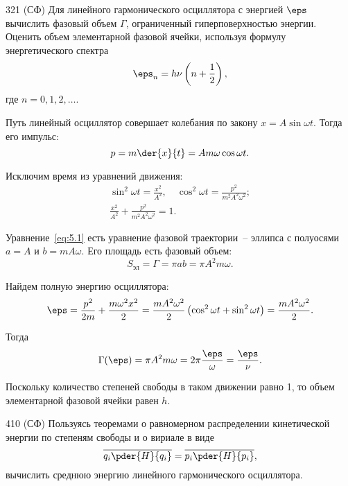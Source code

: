 \documentclass[pscyr]{hedwork}
\begin{document}
  \begin{task}{321 (СФ)}{
    Для линейного гармонического осциллятора с энергией \( \eps \) вычислить
    фазовый объем \( \Gamma \), ограниченный гиперповерхностью энергии. Оценить
    объем элементарной фазовой ячейки, используя формулу энергетического спектра
    \[
      \eps_n = h\nu \left(n + \frac{1}{2}\right),
    \]
    где \( n = 0, 1, 2, \ldots \).
  }
  
    Путь линейный осциллятор совершает колебания по закону
    \( x = A\sin\omega t \). Тогда его импульс:
    \[
      p = m\der{x}{t} = Am\omega\cos\omega t.
    \]
    
    Исключим время из уравнений движения:
    \begin{gather}
      \sin^2\omega t = \frac{x^2}{A^2}, \quad \cos^2\omega t =
        \frac{p^2}{m^2A^2\omega^2}; \nonumber \\
      \frac{x^2}{A^2} + \frac{p^2}{m^2A^2\omega^2} = 1. \label{eq:5.1}
    \end{gather}
    
    Уравнение~\eqref{eq:5.1} есть уравнение фазовой траектории~-- эллипса с
    полуосями \( a = A \) и \( b = mA\omega \). Его площадь есть фазовый объем:
    \[
      S_\text{эл} = \Gamma = \pi ab = \pi A^2m\omega.
    \]
    
    Найдем полную энергию осциллятора:
    \[
      \eps = \frac{p^2}{2m} + \frac{m\omega^2x^2}{2} =
        \frac{mA^2\omega^2}{2}\left(\cos^2\omega t + \sin^2\omega t\right) =
        \frac{mA^2\omega^2}{2}.
    \]
    
    Тогда
    \[
      \Gamma(\eps) = \pi A^2m\omega = 2\pi\frac{\eps}{\omega} =
        \frac{\eps}{\nu}.
    \]
    
    Поскольку количество степеней свободы в таком движении равно 1, то
    объем элементарной фазовой ячейки равен \( h \).

  \end{task}

  \begin{task}{410 (СФ)}{
    Пользуясь теоремами о равномерном распределении кинетической энергии по
    степеням свободы и о вириале в виде
    \[
      \overline{q_i\pder{H}{q_i}} = \overline{p_i\pder{H}{p_i}},
    \]
    вычислить среднюю энергию линейного гармонического осциллятора.
  }

    

  \end{task}
\end{document}
